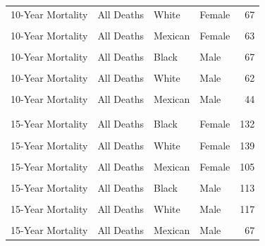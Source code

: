 \documentclass[
]{article}
\begin{document}
\begin{table}[!h]
\begin{tabular}[t]{llllr}
10-Year Mortality & All Deaths & White & Female & 67\\
\cellcolor{gray!10}{10-Year Mortality} & \cellcolor{gray!10}{CVD} & \cellcolor{gray!10}{Mexican} & \cellcolor{gray!10}{Female} & \cellcolor{gray!10}{19}\\
10-Year Mortality & All Deaths & Mexican & Female & 63\\
\cellcolor{gray!10}{10-Year Mortality} & \cellcolor{gray!10}{CVD} & \cellcolor{gray!10}{Black} & \cellcolor{gray!10}{Male} & \cellcolor{gray!10}{17}\\
10-Year Mortality & All Deaths & Black & Male & 67\\
\cellcolor{gray!10}{10-Year Mortality} & \cellcolor{gray!10}{CVD} & \cellcolor{gray!10}{White} & \cellcolor{gray!10}{Male} & \cellcolor{gray!10}{13}\\
10-Year Mortality & All Deaths & White & Male & 62\\
\cellcolor{gray!10}{10-Year Mortality} & \cellcolor{gray!10}{CVD} & \cellcolor{gray!10}{Mexican} & \cellcolor{gray!10}{Male} & \cellcolor{gray!10}{10}\\
10-Year Mortality & All Deaths & Mexican & Male & 44\\
\addlinespace\\
\cellcolor{gray!10}{15-Year Mortality} & \cellcolor{gray!10}{CVD} & \cellcolor{gray!10}{Black} & \cellcolor{gray!10}{Female} & \cellcolor{gray!10}{37}\\
15-Year Mortality & All Deaths & Black & Female & 132\\
\cellcolor{gray!10}{15-Year Mortality} & \cellcolor{gray!10}{CVD} & \cellcolor{gray!10}{White} & \cellcolor{gray!10}{Female} & \cellcolor{gray!10}{44}\\
15-Year Mortality & All Deaths & White & Female & 139\\
\cellcolor{gray!10}{15-Year Mortality} & \cellcolor{gray!10}{CVD} & \cellcolor{gray!10}{Mexican} & \cellcolor{gray!10}{Female} & \cellcolor{gray!10}{35}\\
15-Year Mortality & All Deaths & Mexican & Female & 105\\
\cellcolor{gray!10}{15-Year Mortality} & \cellcolor{gray!10}{CVD} & \cellcolor{gray!10}{Black} & \cellcolor{gray!10}{Male} & \cellcolor{gray!10}{26}\\
15-Year Mortality & All Deaths & Black & Male & 113\\
\cellcolor{gray!10}{15-Year Mortality} & \cellcolor{gray!10}{CVD} & \cellcolor{gray!10}{White} & \cellcolor{gray!10}{Male} & \cellcolor{gray!10}{29}\\
15-Year Mortality & All Deaths & White & Male & 117\\
\cellcolor{gray!10}{15-Year Mortality} & \cellcolor{gray!10}{CVD} & \cellcolor{gray!10}{Mexican} & \cellcolor{gray!10}{Male} & \cellcolor{gray!10}{18}\\
15-Year Mortality & All Deaths & Mexican & Male & 67\\
\bottomrule
\end{tabular}
\end{table}
\end{document}
